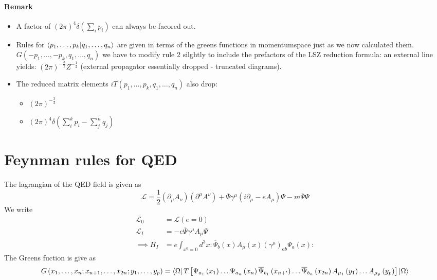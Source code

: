 \documentclass{report}
\begin{document}
\paragraph{Remark}
\begin{itemize}
  \item A factor of $\left( 2\pi \right) ^{4} \delta\left( \sum_{i}^{} p_i  \right)  $ can always be facored out.
  \item Rules for $\bra{p_1,\ldots,p_k} \ket{q_1,\ldots,q_n} $ are given in terms of the greens functions in momentumspace just as we now calculated them. $G\left( -p_1,\ldots,-p_k, q_1,\ldots,q_n \right) $ we have to modify rule 2 silghtly to include the prefactors of the LSZ reduction formula: an external line yields: $\left( 2\pi \right) ^{-\frac{3}{2} } Z^{-\frac{1}{2} } $ (external propagator essentially dropped - truncated diagrams).
  \item The reduced matrix elements $iT\left( p_1,\ldots,p_k, q_1,\ldots,q_n \right) $ also drop:
    \begin{itemize}
      \item $\left( 2\pi \right) ^{-\frac{3}{2} } $
      \item $\left( 2\pi \right) ^{4} \delta\left( \sum_{i}^{k} p_i - \sum_{j}^{n} q_j \right) $
    \end{itemize}
\end{itemize}
\section{Feynman rules for QED}
The lagrangian of the QED field is given as \[
\mathcal{L} = \frac{1}{2} \left( \partial_\mu A_\nu  \right) \left( \partial^{\mu} A^{\nu}  \right) + \overline{\Psi} \gamma^{\mu} \left( i \partial_\mu - e A_\mu  \right) \Psi - m\overline{\Psi}\Psi
\] We write 
\begin{align*}
  \mathcal{L}_0 &= \mathcal{L} \left( e = 0 \right) \\
  \mathcal{L}_I &= -e \overline{\Psi} \gamma^{\mu} A_\mu \Psi \\
  \implies H_I &= e \int_{x^{0} =0}^{} d^{3}x  :\overline{\Psi}_b\left( x \right) A_\mu\left( x \right) \left( \gamma^{\mu}  \right)_{ab}  \Psi_a\left( x \right) : 
\end{align*}
The Greens fuction is give as
\begin{align*}
  G\left( x_1,\ldots,x_n; x_{n+1} ,\ldots,x_{2n} ; y_1,\ldots,y_p \right) &= 
  \bra{\Omega} T\left[ \Psi_{a_1} \left( x_1 \right) \ldots \Psi_{a_n}\left( x_n \right) \overline{\Psi}_{b_1} \left( x_{n+'}  \right) \ldots \overline{\Psi}_{b_n} \left( x_{2n}  \right) A_{\mu_1} \left( y_1 \right) \ldots A_{\mu_p} \left( y_p \right)  \right] \ket{\Omega}  \\
\end{align*}
\end{document}
